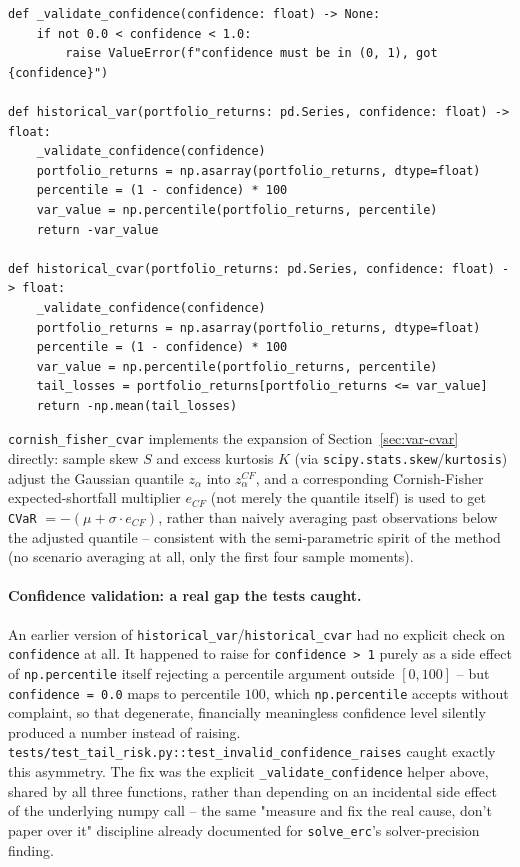 \documentclass[11pt]{article}
\begin{document}
\begin{lstlisting}
def _validate_confidence(confidence: float) -> None:
    if not 0.0 < confidence < 1.0:
        raise ValueError(f"confidence must be in (0, 1), got {confidence}")

def historical_var(portfolio_returns: pd.Series, confidence: float) -> float:
    _validate_confidence(confidence)
    portfolio_returns = np.asarray(portfolio_returns, dtype=float)
    percentile = (1 - confidence) * 100
    var_value = np.percentile(portfolio_returns, percentile)
    return -var_value

def historical_cvar(portfolio_returns: pd.Series, confidence: float) -> float:
    _validate_confidence(confidence)
    portfolio_returns = np.asarray(portfolio_returns, dtype=float)
    percentile = (1 - confidence) * 100
    var_value = np.percentile(portfolio_returns, percentile)
    tail_losses = portfolio_returns[portfolio_returns <= var_value]
    return -np.mean(tail_losses)
\end{lstlisting}

\texttt{cornish\_fisher\_cvar} implements the expansion of
Section~\ref{sec:var-cvar} directly: sample skew $S$ and excess kurtosis
$K$ (via \texttt{scipy.stats.skew}/\texttt{kurtosis}) adjust the Gaussian
quantile $z_\alpha$ into $z_\alpha^{CF}$, and a corresponding
Cornish-Fisher expected-shortfall multiplier $e_{CF}$ (not merely the
quantile itself) is used to get \texttt{CVaR} $= -(\mu + \sigma \cdot
e_{CF})$, rather than naively averaging past observations below the
adjusted quantile -- consistent with the semi-parametric spirit of the
method (no scenario averaging at all, only the first four sample
moments).

\paragraph{Confidence validation: a real gap the tests caught.} An
earlier version of \texttt{historical\_var}/\texttt{historical\_cvar}
had no explicit check on \texttt{confidence} at all. It happened to
raise for \texttt{confidence > 1} purely as a side effect of
\texttt{np.percentile} itself rejecting a percentile argument outside
$[0, 100]$ -- but \texttt{confidence = 0.0} maps to percentile $100$,
which \texttt{np.percentile} accepts without complaint, so that
degenerate, financially meaningless confidence level silently produced
a number instead of raising. \texttt{tests/test\_tail\_risk.py::test\_invalid\_confidence\_raises}
caught exactly this asymmetry. The fix was the explicit
\texttt{\_validate\_confidence} helper above, shared by all three
functions, rather than depending on an incidental side effect of the
underlying numpy call -- the same "measure and fix the real cause, don't
paper over it" discipline already documented for \texttt{solve\_erc}'s
solver-precision finding.
\end{document}
